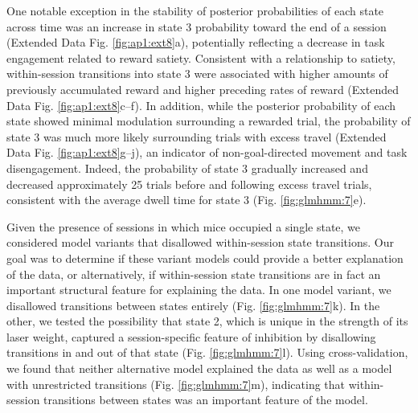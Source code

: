One notable exception in the stability of posterior probabilities of each state across time was an increase in state 3 probability toward the end of a session (Extended Data Fig. \ref{fig:ap1:ext8}a), potentially reflecting a decrease in task engagement related to reward satiety. Consistent with a relationship to satiety, within-session transitions into state 3 were associated with higher amounts of previously accumulated reward and higher preceding rates of reward (Extended Data Fig. \ref{fig:ap1:ext8}c–f). In addition, while the posterior probability of each state showed minimal modulation surrounding a rewarded trial, the probability of state 3 was much more likely surrounding trials with excess travel (Extended Data Fig. \ref{fig:ap1:ext8}g–j), an indicator of non-goal-directed movement and task disengagement. Indeed, the probability of state 3 gradually increased and decreased approximately 25 trials before and following excess travel trials, consistent with the average dwell time for state 3 (Fig. \ref{fig:glmhmm:7}e).

Given the presence of sessions in which mice occupied a single state, we considered model variants that disallowed within-session state transitions. Our goal was to determine if these variant models could provide a better explanation of the data, or alternatively, if within-session state transitions are in fact an important structural feature for explaining the data. In one model variant, we disallowed transitions between states entirely (Fig. \ref{fig:glmhmm:7}k). In the other, we tested the possibility that state 2, which is unique in the strength of its laser weight, captured a session-specific feature of inhibition by disallowing transitions in and out of that state (Fig. \ref{fig:glmhmm:7}l). Using cross-validation, we found that neither alternative model explained the data as well as a model with unrestricted transitions (Fig. \ref{fig:glmhmm:7}m), indicating that within-session transitions between states was an important feature of the model.

